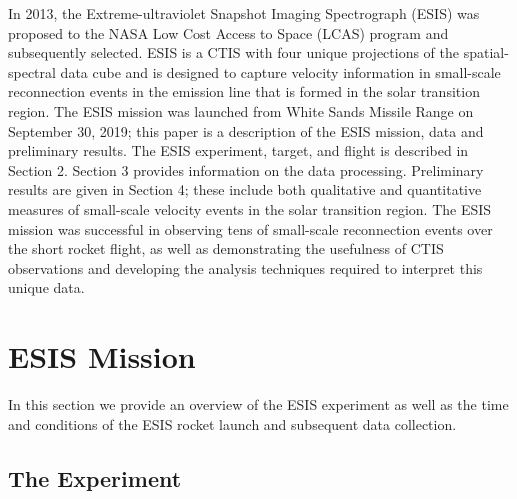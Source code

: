     In 2013, the Extreme-ultraviolet Snapshot Imaging Spectrograph (ESIS) was proposed to the NASA Low Cost Access to Space (LCAS) program and subsequently selected.  
    ESIS is a CTIS with four unique projections of the spatial-spectral data cube and is designed to capture velocity information in small-scale reconnection events in the \ov emission line that is formed in the solar transition region.  
    The ESIS mission was launched from White Sands Missile Range on September 30,  2019; this paper is a description of the ESIS mission, data and preliminary results.  
    The ESIS experiment, target, and flight is described in Section 2.  
    Section 3 provides information on the data processing.  Preliminary results are given in Section 4; these include both qualitative and quantitative measures of small-scale velocity events in the solar transition region.  The ESIS mission was successful in  observing tens of small-scale reconnection events over the short rocket flight, as well as demonstrating the usefulness of CTIS observations and developing the analysis techniques required to interpret this unique data.


\section{ESIS Mission}

In this section we provide an overview of the ESIS experiment as well as the time and conditions of the ESIS rocket launch and subsequent data collection.   

	\subsection{The Experiment}
	  	

